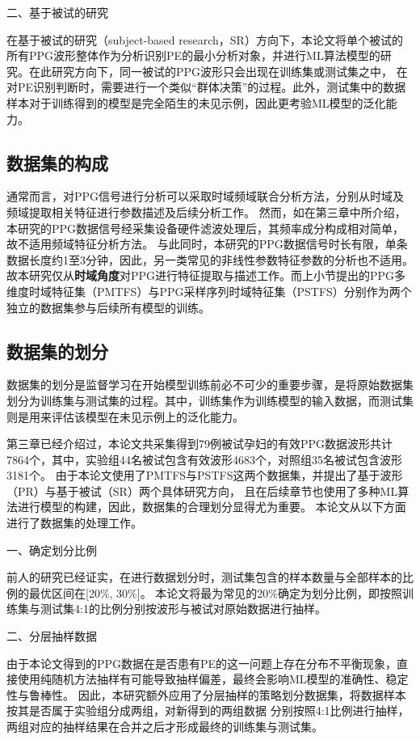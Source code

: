 二、基于被试的研究

在基于被试的研究（subject-based research，SR）方向下，本论文将单个被试的所有PPG波形整体作为分析识别PE的最小分析对象，并进行ML算法模型的研究。在此研究方向下，同一被试的PPG波形只会出现在训练集或测试集之中，
在对PE识别判断时，需要进行一个类似“群体决策”的过程。此外，测试集中的数据样本对于训练得到的模型是完全陌生的未见示例，因此更考验ML模型的泛化能力。

\subsection{数据集的构成}
通常而言，对PPG信号进行分析可以采取时域频域联合分析方法，分别从时域及频域提取相关特征进行参数描述及后续分析工作。
然而，如在第三章中所介绍，本研究的PPG数据信号经采集设备硬件滤波处理后，其频率成分构成相对简单，故不适用频域特征分析方法。
与此同时，本研究的PPG数据信号时长有限，单条数据长度约1至3分钟，因此，另一类常见的非线性参数特征参数的分析也不适用。
故本研究仅从\textbf{时域角度}对PPG进行特征提取与描述工作。而上小节提出的PPG多维度时域特征集（PMTFS）与PPG采样序列时域特征集（PSTFS）分别作为两个独立的数据集参与后续所有模型的训练。

\subsection{数据集的划分}
数据集的划分是监督学习在开始模型训练前必不可少的重要步骤，是将原始数据集划分为训练集与测试集的过程。其中，训练集作为训练模型的输入数据，而测试集则是用来评估该模型在未见示例上的泛化能力。

第三章已经介绍过，本论文共采集得到79例被试孕妇的有效PPG数据波形共计7864个，其中，实验组44名被试包含有效波形4683个，对照组35名被试包含波形3181个。
由于本论文使用了PMTFS与PSTFS这两个数据集，并提出了基于波形（PR）与基于被试（SR）两个具体研究方向，
且在后续章节也使用了多种ML算法进行模型的构建，因此，数据集的合理划分显得尤为重要。
本论文从以下方面进行了数据集的处理工作。

一、确定划分比例

前人的研究已经证实，在进行数据划分时，测试集包含的样本数量与全部样本的比例的最优区间在[20\%, 30\%]\cite{Gholamy2018Why7O}。
本论文将最为常见的20\%确定为划分比例，即按照训练集与测试集4:1的比例分别按波形与被试对原始数据进行抽样。

二、分层抽样数据

由于本论文得到的PPG数据在是否患有PE的这一问题上存在分布不平衡现象，直接使用纯随机方法抽样有可能导致抽样偏差，最终会影响ML模型的准确性、稳定性与鲁棒性\cite{Aurélien2018}。
因此，本研究额外应用了分层抽样的策略划分数据集，将数据样本按其是否属于实验组分成两组，对新得到的两组数据
分别按照4:1比例进行抽样，两组对应的抽样结果在合并之后才形成最终的训练集与测试集\cite{Aurélien2018}。

